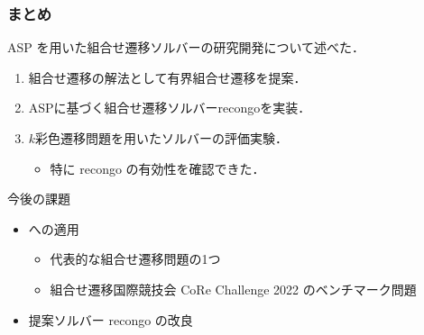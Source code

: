 \documentclass[dvipdfmx,11pt]{beamer}
\begin{document}
\begin{frame}\frametitle{まとめ}

  \begin{alertblock}{}\centering
    ASP を用いた組合せ遷移ソルバーの研究開発について述べた．
  \end{alertblock}

  \begin{enumerate}
    \item 組合せ遷移の解法として有界組合せ遷移を提案．
    \item ASPに基づく組合せ遷移ソルバーrecongoを実装．
    \item $k$彩色遷移問題を用いたソルバーの評価実験．
    \begin{itemize}
      \item 特に
        recongo の有効性を確認できた．
    \end{itemize}
  \end{enumerate}
  
  \begin{exampleblock}{今後の課題}
    \begin{itemize}
    \item {}への適用
      \begin{itemize}
      \item 代表的な組合せ遷移問題の1つ
      \item 組合せ遷移国際競技会 CoRe Challenge 2022 のベンチマーク問題
      \end{itemize}
      \item 提案ソルバー recongo の改良
    \end{itemize}
  \end{exampleblock}
\end{frame}
\end{document}
